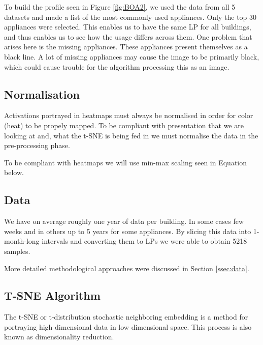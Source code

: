 To build the profile seen in Figure \ref{fig:BOA2}, we used the data from all 5 datasets and made a list of the most commonly used appliances.
Only the top 30 appliances were selected.
This enables us to have the same LP for all buildings, and thus enables us to see how the usage differs across them.
One problem that arises here is the missing appliances.
These appliances present themselves as a black line.
A lot of missing appliances may cause the image to be primarily black,
which could cause trouble for the algorithm processing this as an image.

\subsection{Normalisation}
\label{ssec:normalisation}
Activations portrayed in heatmaps must always be normalised in order for color (heat) to be propely mapped.
To be compliant with presentation that we are looking at and, what the t-SNE is being fed in we must
normalise the data in the pre-processing phase. 

To be compliant with heatmaps we will use min-max scaling seen in Equation below.

	
	
\subsection{Data}

We have on average roughly one year of data per building. 
In some cases few weeks and in others up to 5 years for some appliances.
By slicing this data into 1-month-long intervals and converting them to LPs we were able to obtain 5218 samples.

More detailed methodological approaches were discussed in Section \ref{ssec:data}.

\subsection{T-SNE Algorithm}

The t-SNE \cite{tsne2} or t-distribution stochastic neighboring embedding is a method for portraying high dimensional 
data in low dimensional space. This process is also known as dimensionality reduction.

